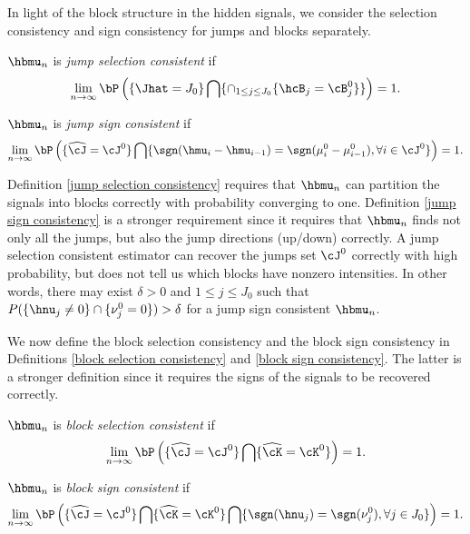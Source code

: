 \documentclass[12pt]{article}
\begin{document}
In light of  the block structure in the hidden signals,
  we consider  the selection consistency and sign consistency
 for jumps and blocks separately.
 \begin{definition}\label{jump selection consistency}
 $\hbmu_n$ is {\it jump selection consistent} if
$$
\lim_{n\to \infty} \bP\left(\{\Jhat = J_0\} \bigcap\{ \cap_{1\le j\le J_0}\{\hcB_j=\cB_j^0 \}\}\right)=1.
$$
\end{definition}
\begin{definition}\label{jump sign consistency}
 $\hbmu_n$ is {\it jump sign consistent} if
$$
\lim_{n\to \infty} \bP\left(\{\widehat \cJ = \cJ^0\}
      \bigcap \{\sgn(\hmu_i-\hmu_{i-1} )=\sgn(\mu_i^0-\mu_{i-1}^0) , \forall i\in \cJ^0\}\right)=1.
$$
\end{definition}

Definition \ref{jump selection consistency} requires that $\hbmu_n$ can  partition the signals into
 blocks correctly with probability converging to one.
Definition \ref{jump sign consistency} is a stronger requirement since
it requires that
$\hbmu_n$ finds not only all the jumps,
but also the jump directions (up/down)  correctly.
A jump selection consistent estimator can
recover the jumps set $\cJ^0$ correctly with high probability,
but does not tell us which blocks have
nonzero intensities. In other words,
 there may  exist $\delta>0$ and  $1\le j\le J_0$ such that
$P(\{\hnu_j\neq 0\} \cap \{\nu_j^0=0\})>\delta$ for a jump sign consistent $\hbmu_n$.

We now define the block selection consistency
and  the block sign consistency
in Definitions \ref{block selection consistency} and \ref{block sign consistency}.
The latter is a stronger definition since it requires the
signs of the signals to be recovered correctly.

\begin{definition}\label{block selection consistency}
 $\hbmu_n$ is {\it block selection consistent} if
$$
\lim_{n\to \infty} \bP\left( \{\widehat \cJ = \cJ^0 \}
\bigcap \{\widehat{\cK} = \cK^0\}\right)=1.
$$
\end{definition}
\begin{definition}\label{block sign consistency}
 $\hbmu_n$ is {\it block sign consistent} if
$$
\lim_{n\to \infty} \bP\left(\{\widehat \cJ = \cJ^0\}
\bigcap \{\widehat{\cK} = \cK^0\}
 \bigcap \{\sgn(\hnu_j)=\sgn(\nu_j^0), \forall j\in J_0\}\right)=1.
$$
\end{definition}
\end{document}

